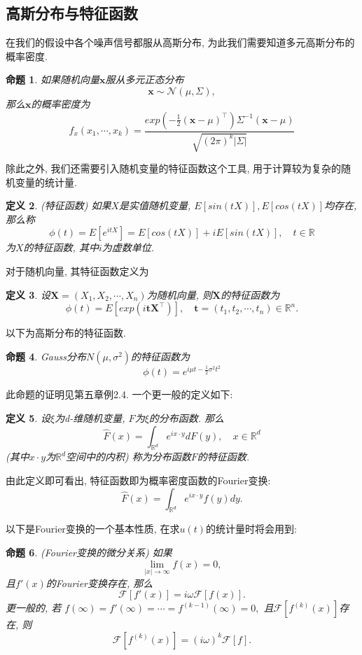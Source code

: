 \documentclass[notitlepage,cs4size,punct,oneside]{ctexrep}
\numberwithin{equation}{section}
\theoremstyle{mystyle}
\newtheorem{definition}{\hspace{2em}定义}[section]
\newtheorem{proposition}[definition]{\hspace{2em}命题}
\begin{document}
\subsection{高斯分布与特征函数}
在我们的假设中各个噪声信号都服从高斯分布, 为此我们需要知道多元高斯分布的概率密度\cite{shuyuanhe2006probability}.
\begin{proposition} \label{multiVariable gaussian pdf}
如果随机向量$\textbf{x}$服从多元正态分布
$$\textbf{x} \sim \mathcal{N}(\mu, \Sigma),$$
那么$\textbf{x}$的概率密度为
$$f_x(x_1, \cdots, x_k) = \frac{exp\left(-\frac{1}{2}(\textbf{x}-\mu)^\top\right)\Sigma^{-1}(\textbf{x}-\mu)}{\sqrt{(2\pi)^k|\Sigma|}}$$
\end{proposition}

除此之外, 我们还需要引入随机变量的特征函数这个工具, 用于计算较为复杂的随机变量的统计量.
\begin{definition}(特征函数) 如果$X$是实值随机变量, $E[sin(tX)], E[cos(tX)]$均存在, 那么称
$$\phi(t) = E\left[e^{itX}\right] = E[cos(tX)] + iE[sin(tX)], \quad t\in \mathbb{R}$$
为$X$的特征函数, 其中$i$为虚数单位.
\end{definition}
对于随机向量, 其特征函数定义为
\begin{definition} 设$\textbf{X} = (X_1, X_2, \cdots, X_n)$为随机向量, 则$\textbf{X}$的特征函数为
$$\phi(t) = E\left[exp(i\textbf{t}\textbf{X}^\top)\right], \quad \textbf{t} = (t_1, t_2, \cdots, t_n)\in \mathbb{R}^n.$$
\end{definition}
以下为高斯分布的特征函数.
\begin{proposition} \label{Characteristic function of Gaussian Distribution}
Gauss分布$N(\mu, \sigma^2)$的特征函数为
$$\phi(t) = e^{i\mu t - \frac{1}{2}\sigma^2t^2}$$
\end{proposition}
此命题的证明见\cite{shuyuanhe2006probability}第五章例2.4.
一个更一般的定义如下\cite{jiangangying2013probability}:
\begin{definition} \label{characteristic function definition 2} 设$\xi$为d-维随机变量, $F$为$\xi$的分布函数. 那么
$$\hat{F}(x) = \int_{\mathbb{R}^d} e^{ix\cdot y}dF(y), \quad x\in \mathbb{R}^d$$
(其中$x\cdot y$为$\mathbb{R}^d$空间中的内积) 称为分布函数$F$的特征函数.
\end{definition}
由此定义即可看出, 特征函数即为概率密度函数的Fourier变换:
\begin{equation} \label{characteristic function definition 3}
\hat{F}(x) = \int_{\mathbb{R}^d}e^{ix\cdot y}f(y)dy.
\end{equation}

以下是Fourier变换的一个基本性质, 在求$u(t)$的统计量时将会用到:
\begin{proposition}(Fourier变换的微分关系) \label{Fourier transform property 1}
如果
$$\lim_{|x|\to\infty} f(x) = 0,$$
且$f'(x)$的Fourier变换存在, 那么
$$\mathcal{F}[f'(x)] = i\omega\mathcal{F}[f(x)].$$
更一般的, 若
$f(\infty) = f'(\infty) = \cdots = f^{(k-1)}(\infty) = 0,$ 且$\mathcal{F}[f^{(k)}(x)]$存在, 则
$$\mathcal{F}[f^{(k)}(x)] = (i\omega)^k \mathcal{F}[f].$$
\end{proposition}
\end{document}
